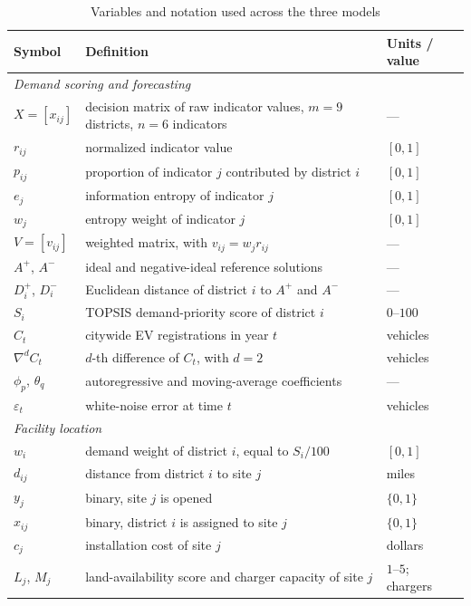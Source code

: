 \documentclass[12pt]{article}
\begin{document}
\begin{table}[H]
\centering
\caption{Variables and notation used across the three models}
\label{tab:notation}
\renewcommand{\arraystretch}{0.95}
\begin{tabular}{@{}p{}p{}p{}@{}}
\toprule
Symbol & Definition & Units / value \\
\midrule
\multicolumn{3}{l}{\textit{Demand scoring and forecasting}} \\
$X = [x_{ij}]$ & decision matrix of raw indicator values, $m=9$ districts, $n=6$ indicators & --- \\
$r_{ij}$ & normalized indicator value & $[0,1]$ \\
$p_{ij}$ & proportion of indicator $j$ contributed by district $i$ & $[0,1]$ \\
$e_j$ & information entropy of indicator $j$ & $[0,1]$ \\
$w_j$ & entropy weight of indicator $j$ & $[0,1]$ \\
$V = [v_{ij}]$ & weighted matrix, with $v_{ij}=w_j r_{ij}$ & --- \\
$A^+$, $A^-$ & ideal and negative-ideal reference solutions & --- \\
$D_i^+$, $D_i^-$ & Euclidean distance of district $i$ to $A^+$ and $A^-$ & --- \\
$S_i$ & TOPSIS demand-priority score of district $i$ & $0$--$100$ \\
$C_t$ & citywide EV registrations in year $t$ & vehicles \\
$\nabla^d C_t$ & $d$-th difference of $C_t$, with $d=2$ & vehicles \\
$\phi_p$, $\theta_q$ & autoregressive and moving-average coefficients & --- \\
$\varepsilon_t$ & white-noise error at time $t$ & vehicles \\
\midrule
\multicolumn{3}{l}{\textit{Facility location}} \\
$w_i$ & demand weight of district $i$, equal to $S_i/100$ & $[0,1]$ \\
$d_{ij}$ & distance from district $i$ to site $j$ & miles \\
$y_j$ & binary, site $j$ is opened & $\{0,1\}$ \\
$x_{ij}$ & binary, district $i$ is assigned to site $j$ & $\{0,1\}$ \\
$c_j$ & installation cost of site $j$ & dollars \\
$L_j$, $M_j$ & land-availability score and charger capacity of site $j$ & $1$--$5$; chargers \\

\end{tabular}
\end{table}
\end{document}
